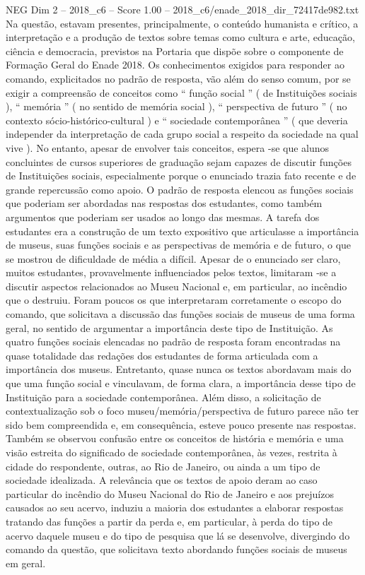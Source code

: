 \begin{textsample}{NEG Dim 2 – 2018\_c6 – Score 1.00 – 2018\_c6/enade\_2018\_dir\_72417de982.txt}
Na questão, estavam presentes, principalmente, o conteúdo humanista e crítico, a interpretação e a produção de textos sobre temas como cultura e arte, educação, ciência e democracia, previstos na Portaria que dispõe sobre o componente de Formação Geral do Enade 2018.
Os conhecimentos exigidos para responder ao comando, explicitados no padrão de resposta, vão além do senso comum, por se exigir a compreensão de conceitos como “ função social ” ( de Instituições sociais ), “ memória ” ( no sentido de memória social ), “ perspectiva de futuro ” ( no contexto sócio-histórico-cultural ) e “ sociedade contemporânea ” ( que deveria independer da interpretação de cada grupo social a respeito da sociedade na qual vive ).
No entanto, apesar de envolver tais conceitos, espera -se que alunos concluintes de cursos superiores de graduação sejam capazes de discutir funções de Instituições sociais, especialmente porque o enunciado trazia fato recente e de grande repercussão como apoio.
O padrão de resposta elencou as funções sociais que poderiam ser abordadas nas respostas dos estudantes, como também argumentos que poderiam ser usados ao longo das mesmas.
A tarefa dos estudantes era a construção de um texto expositivo que articulasse a importância de museus, suas funções sociais e as perspectivas de memória e de futuro, o que se mostrou de dificuldade de média a difícil.
Apesar de o enunciado ser claro, muitos estudantes, provavelmente influenciados pelos textos, limitaram -se a discutir aspectos relacionados ao Museu Nacional e, em particular, ao incêndio que o destruiu.
Foram poucos os que interpretaram corretamente o escopo do comando, que solicitava a discussão das funções sociais de museus de uma forma geral, no sentido de argumentar a importância deste tipo de Instituição.
As quatro funções sociais elencadas no padrão de resposta foram encontradas na quase totalidade das redações dos estudantes de forma articulada com a importância dos museus.
Entretanto, quase nunca os textos abordavam mais do que uma função social e vinculavam, de forma clara, a importância desse tipo de Instituição para a sociedade contemporânea.
Além disso, a solicitação de contextualização sob o foco museu/memória/perspectiva de futuro parece não ter sido bem compreendida e, em consequência, esteve pouco presente nas respostas.
Também se observou confusão entre os conceitos de história e memória e uma visão estreita do significado de sociedade contemporânea, às vezes, restrita à cidade do respondente, outras, ao Rio de Janeiro, ou ainda a um tipo de sociedade idealizada.
A relevância que os textos de apoio deram ao caso particular do incêndio do Museu Nacional do Rio de Janeiro e aos prejuízos causados ao seu acervo, induziu a maioria dos estudantes a elaborar respostas tratando das funções a partir da perda e, em particular, à perda do tipo de acervo daquele museu e do tipo de pesquisa que lá se desenvolve, divergindo do comando da questão, que solicitava texto abordando funções sociais de museus em geral.

\end{textsample}
